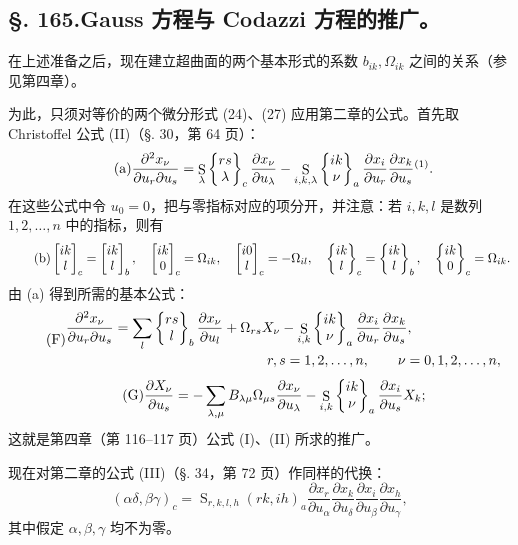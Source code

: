 \subsection*{\S. 165.\quad Gauss 方程与 Codazzi 方程的推广。}

在上述准备之后，现在建立超曲面的两个基本形式的系数 \(b_{ik},\Omega_{ik}\) 之间的关系（参见第四章）。

为此，只须对等价的两个微分形式 (24)、(27) 应用第二章的公式。首先取 Christoffel 公式 (II)（\S. 30，第 64 页）：
\begin{equation}\tag{a}
 \frac{\partial^2x_\nu}{\partial u_r\partial u_s}
 =\mathop{\mathrm{S}}_{\lambda}\chrB{rs}{\lambda}_{c}\frac{\partial x_\nu}{\partial u_\lambda}
 -\mathop{\mathrm{S}}_{i,k,\lambda}\chrB{ik}{\nu}_{a}
 \frac{\partial x_i}{\partial u_r}\frac{\partial x_k}{\partial u_s}\srcfnmark{1}.
\end{equation}
在这些公式中令 \(u_0=0\)，把与零指标对应的项分开，并注意：若 \(i,k,l\) 是数列 \(1,2,\ldots,n\) 中的指标，则有
\begin{equation}\tag{b}
\left[\begin{matrix}ik\\l\end{matrix}\right]_{c}=\left[\begin{matrix}ik\\l\end{matrix}\right]_{b},
\quad
\left[\begin{matrix}ik\\0\end{matrix}\right]_{c}=\Omega_{ik},
\quad
\left[\begin{matrix}i0\\l\end{matrix}\right]_{c}=-\Omega_{il},
\quad
\left\{\begin{matrix}ik\\l\end{matrix}\right\}_{c}=\left\{\begin{matrix}ik\\l\end{matrix}\right\}_{b},
\quad
\left\{\begin{matrix}ik\\0\end{matrix}\right\}_{c}=\Omega_{ik}.
\end{equation}
由 (a) 得到所需的基本公式：
\begin{equation}\tag{F}
\begin{aligned}
\frac{\partial^2x_\nu}{\partial u_r\partial u_s}
 &=\sum_l\chrB{rs}{l}_{b}\frac{\partial x_\nu}{\partial u_l}+\Omega_{rs}X_\nu
 -\mathop{\mathrm{S}}_{i,k}\chrB{ik}{\nu}_{a}\frac{\partial x_i}{\partial u_r}\frac{\partial x_k}{\partial u_s},\\[-0.2em]
&\hspace{11em} r,s=1,2,
\ldots,n,\qquad \nu=0,1,2,
\ldots,n,
\end{aligned}
\end{equation}
\begin{equation}\tag{G}
 \frac{\partial X_\nu}{\partial u_s}
 =-\sum_{\lambda,\mu}B_{\lambda\mu}\Omega_{\mu s}\frac{\partial x_\nu}{\partial u_\lambda}
 -\mathop{\mathrm{S}}_{i,k}\left\{\begin{matrix}ik\\\nu\end{matrix}\right\}_{a}\frac{\partial x_i}{\partial u_s}X_k;
\end{equation}
这就是第四章（第 116--117 页）公式 (I)、(II) 所求的推广。

现在对第二章的公式 (III)（\S. 34，第 72 页）作同样的代换：
\[
 (\alpha\delta,\beta\gamma)_c=
 \mathop{\mathrm{S}}_{r,k,l,h}(rk,ih)_a
 \frac{\partial x_r}{\partial u_\alpha}\frac{\partial x_k}{\partial u_\delta}
 \frac{\partial x_i}{\partial u_\beta}\frac{\partial x_h}{\partial u_\gamma},
\]
其中假定 \(\alpha,\beta,\gamma\) 均不为零。

